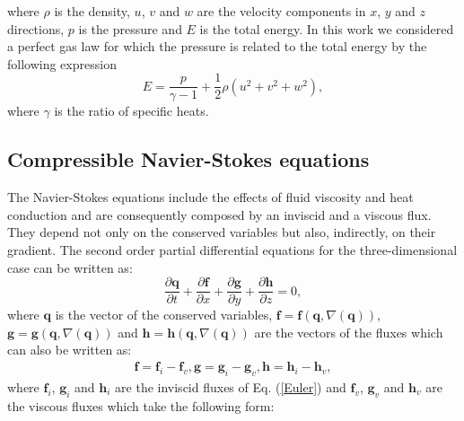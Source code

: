 where $\rho$ is the density, $u$, $v$ and $w$ are the velocity components in $x$, $y$ and 
$z$ directions, $p$ is the pressure and $E$ is the total energy. In this work we considered 
a perfect gas law for which the pressure is related to the total energy by the following expression
\begin{equation}
E = \frac{p}{\gamma - 1} + \frac{1}{2} \rho(u^2 + v^2 + w^2), 
\label{energy}
\end{equation}
where $\gamma$ is the ratio of specific heats.
\subsection{Compressible Navier-Stokes equations}
The Navier-Stokes equations include the effects of fluid viscosity and heat 
conduction and are consequently composed by an inviscid and a viscous 
flux. They depend not only on the conserved variables but also, indirectly, 
on their gradient. The second order partial differential equations for the 
three-dimensional case can be written as:
\begin{equation}
\frac{\partial \mathbf{q} }{\partial t} + 
\frac{\partial \mathbf{f}}{\partial x} + 
\frac{\partial \mathbf{g}}{\partial y} +  
\frac{\partial \mathbf{h}}{\partial z} = 0,
\end{equation}
where $\mathbf{q} $ is the vector of the conserved variables, $\mathbf{f} = 
\mathbf{f} (\mathbf{q}, \nabla (\mathbf{q}))$, 
$\mathbf{g}=  \mathbf{g} (\mathbf{q}, \nabla (\mathbf{q}))$ and $\mathbf{h} = 
\mathbf{h} (\mathbf{q}, \nabla (\mathbf{q}))$ 
are the vectors of the  fluxes which can also be written as:
\begin{equation}
\begin{array}{l}
\mathbf{f} = \mathbf{f}_i - \mathbf{f}_v,
\mathbf{g} = \mathbf{g}_i - \mathbf{g}_v,
\mathbf{h} = \mathbf{h}_i - \mathbf{h}_v, 
\end{array}
\end{equation}
where $\mathbf{f}_i$, $\mathbf{g}_i $ and $\mathbf{h}_i$ are the inviscid fluxes 
of Eq. (\ref{Euler}) and $\mathbf{f}_v$, $\mathbf{g}_v $ and $\mathbf{h}_v$ are 
the viscous fluxes which take the following form:
